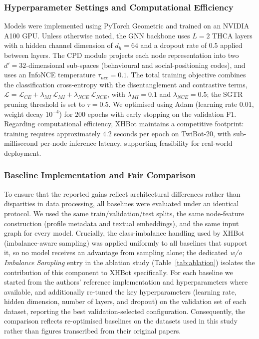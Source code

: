 \subsubsection{Hyperparameter Settings and Computational Efficiency}
Models were implemented using PyTorch Geometric and trained on an NVIDIA A100 GPU. Unless otherwise noted, the GNN backbone uses $L = 2$ THCA layers with a hidden channel dimension of $d_h = 64$ and a dropout rate of $0.5$ applied between layers. The CPD module projects each node representation into two $d' = 32$-dimensional sub-spaces (behavioural and social-positioning codes), and uses an InfoNCE temperature $\tau_{nce} = 0.1$. The total training objective combines the classification cross-entropy with the disentanglement and contrastive terms, $\mathcal{L} = \mathcal{L}_{CE} + \lambda_{MI}\,\mathcal{L}_{MI} + \lambda_{NCE}\,\mathcal{L}_{NCE}$, with $\lambda_{MI} = 0.1$ and $\lambda_{NCE} = 0.5$; the SGTR pruning threshold is set to $\tau = 0.5$. We optimised using Adam (learning rate $0.01$, weight decay $10^{-4}$) for $200$ epochs with early stopping on the validation F1. Regarding computational efficiency, XHBot maintains a competitive footprint: training requires approximately $4.2$ seconds per epoch on TwiBot-20, with sub-millisecond per-node inference latency, supporting feasibility for real-world deployment.

\subsubsection{Baseline Implementation and Fair Comparison}
To ensure that the reported gains reflect architectural differences rather than disparities in data processing, all baselines were evaluated under an identical protocol. We used the same train/validation/test splits, the same node-feature construction (profile metadata and textual embeddings), and the same input graph for every model. Crucially, the class-imbalance handling used by XHBot (imbalance-aware sampling) was applied uniformly to all baselines that support it, so no model receives an advantage from sampling alone; the dedicated \emph{w/o Imbalance Sampling} entry in the ablation study (Table~\ref{tab:ablation}) isolates the contribution of this component to XHBot specifically. For each baseline we started from the authors' reference implementation and hyperparameters where available, and additionally re-tuned the key hyperparameters (learning rate, hidden dimension, number of layers, and dropout) on the validation set of each dataset, reporting the best validation-selected configuration. Consequently, the comparison reflects re-optimised baselines on the datasets used in this study rather than figures transcribed from their original papers.

